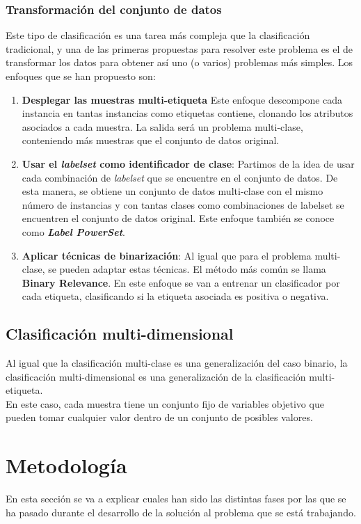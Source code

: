 \subsubsection*{Transformación del conjunto de datos}
Este tipo de clasificación es una tarea más compleja que la clasificación tradicional, y una de las primeras propuestas para resolver este problema es el de transformar los datos para obtener así uno (o varios) problemas más simples.
Los enfoques que se han propuesto son:
\begin{enumerate}
	\item \textbf{Desplegar las muestras multi-etiqueta} Este enfoque descompone cada instancia en tantas instancias como etiquetas contiene, clonando los atributos asociados a cada muestra. La salida será un problema multi-clase, conteniendo más muestras que el conjunto de datos original.
	\item \textbf{Usar el \textit{labelset} como identificador de clase}: Partimos de la idea de usar cada combinación de \textit{labelset} que se encuentre en el conjunto de datos. De esta manera, se obtiene un conjunto de datos multi-clase con el mismo número de instancias y con tantas clases como combinaciones de labelset se encuentren el conjunto de datos original. Este enfoque también se conoce como \textbf{\textit{Label PowerSet}}.
	\item \textbf{Aplicar técnicas de binarización}: Al igual que para el problema multi-clase, se pueden adaptar estas técnicas. El método más común se llama \textbf{Binary Relevance}. En este enfoque se van a entrenar un clasificador por cada etiqueta, clasificando si la etiqueta asociada es positiva o negativa. 
\end{enumerate}
\subsection{Clasificación multi-dimensional}
Al igual que la clasificación multi-clase es una generalización del caso binario, la clasificación multi-dimensional es una generalización de la clasificación multi-etiqueta.\\
En este caso, cada muestra tiene un conjunto fijo de variables objetivo que pueden tomar cualquier valor dentro de un conjunto de posibles valores.
\pagebreak
\section{Metodología}
En esta sección se va a explicar cuales han sido las distintas fases por las que se ha pasado durante el desarrollo de la solución al problema que se está trabajando.
